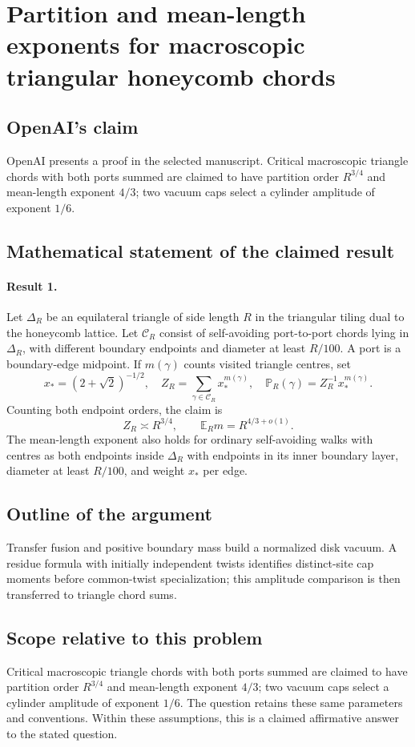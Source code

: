 \documentclass[11pt]{article}
\begin{document}
\section*{Partition and mean-length exponents for macroscopic triangular honeycomb chords}

\subsection{OpenAI's claim}
OpenAI presents a proof in the selected manuscript. Critical macroscopic triangle chords with both ports summed are claimed to have partition order $R^{3/4}$ and mean-length exponent $4/3$; two vacuum caps select a cylinder amplitude of exponent $1/6$.

\subsection{Mathematical statement of the claimed result}
\paragraph{Result 1.} Let $\Delta_R$ be an equilateral triangle of side length $R$ in the triangular tiling dual to the honeycomb lattice. Let $\mathcal C_R$ consist of self-avoiding port-to-port chords lying in $\Delta_R$, with different boundary endpoints and diameter at least $R/100$. A port is a boundary-edge midpoint. If $m(\gamma)$ counts visited triangle centres, set
\[
 x_*=(2+\sqrt2)^{-1/2},\quad Z_R=\sum_{\gamma\in\mathcal C_R}x_*^{m(\gamma)},\quad
 \mathbb P_R(\gamma)=Z_R^{-1}x_*^{m(\gamma)}.
\]
Counting both endpoint orders, the claim is
\[
 Z_R\asymp R^{3/4},\qquad \mathbb E_Rm=R^{4/3+o(1)}.
\]
The mean-length exponent also holds for ordinary self-avoiding walks with centres as both endpoints inside $\Delta_R$ with endpoints in its inner boundary layer, diameter at least $R/100$, and weight $x_*$ per edge.

\subsection{Outline of the argument}
Transfer fusion and positive boundary mass build a normalized disk vacuum. A residue formula with initially independent twists identifies distinct-site cap moments before common-twist specialization; this amplitude comparison is then transferred to triangle chord sums.

\subsection{Scope relative to this problem}
Critical macroscopic triangle chords with both ports summed are claimed to have partition order $R^{3/4}$ and mean-length exponent $4/3$; two vacuum caps select a cylinder amplitude of exponent $1/6$. The question retains these same parameters and conventions. Within these assumptions, this is a claimed affirmative answer to the stated question.
\end{document}
